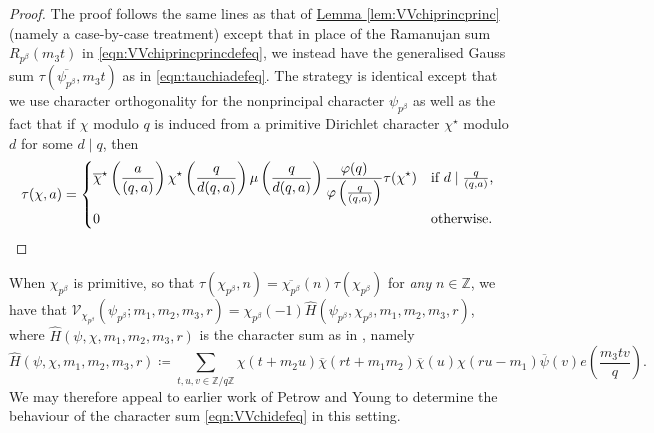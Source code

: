 \documentclass[11pt,a4paper]{amsart}
\newcommand{\VV}{\mathcal{V}}
\newcommand{\Z}{\mathbb{Z}}
\numberwithin{equation}{section}
\theoremstyle{remark}
\theoremstyle{definition}
\begin{document}
\begin{proof}
The proof follows the same lines as that of \hyperref[lem:VVchiprincprinc]{Lemma \ref*{lem:VVchiprincprinc}} (namely a case-by-case treatment) except that in place of the Ramanujan sum $R_{p^{\beta}}(m_3 t)$ in \eqref{eqn:VVchiprincprincdefeq}, we instead have the generalised Gauss sum $\tau(\overline{\psi_{p^{\beta}}},m_3 t)$ as in \eqref{eqn:tauchiadefeq}. The strategy is identical except that we use character orthogonality for the nonprincipal character $\psi_{p^{\beta}}$ as well as the fact that if $\chi$ modulo $q$ is induced from a primitive Dirichlet character $\chi^{\star}$ modulo $d$ for some $d \mid q$, then
\[\tau(\chi,a) = \begin{dcases*}
\overline{\chi}^{\star}\left(\frac{a}{(q,a)}\right) \chi^{\star}\left(\frac{q}{d(q,a)}\right) \mu\left(\frac{q}{d(q,a)}\right) \frac{\varphi(q)}{\varphi\left(\frac{q}{(q,a)}\right)} \tau(\chi^{\star}) & if $d \mid \frac{q}{(q,a)}$,	\\
0 & otherwise.
\end{dcases*}\]
\par\vspace{-1.33\baselineskip}\qedhere
\end{proof}

When $\chi_{p^{\beta}}$ is primitive, so that $\tau(\chi_{p^{\beta}},n) = \overline{\chi_{p^{\beta}}}(n) \tau(\chi_{p^{\beta}})$ for \emph{any} $n \in \Z$, we have that $\VV_{\chi_{p^{\beta}}}(\psi_{p^{\beta}};m_1,m_2,m_3,r) = \chi_{p^{\beta}}(-1) \widehat{H}(\psi_{p^{\beta}},\chi_{p^{\beta}},m_1,m_2,m_3,r)$, where $\widehat{H}(\psi,\chi,m_1,m_2,m_3,r)$ is the character sum as in \cite[(5.13)]{PY20}, namely
\[\widehat{H}(\psi,\chi,m_1,m_2,m_3,r) \coloneqq \sum_{t,u,v \in \Z/q\Z} \chi(t + m_2 u) \overline{\chi}(rt + m_1 m_2) \overline{\chi}(u) \chi(ru - m_1) \overline{\psi}(v) e\left(\frac{m_3 tv}{q}\right).\]
We may therefore appeal to earlier work of Petrow and Young to determine the behaviour of the character sum \eqref{eqn:VVchidefeq} in this setting.
\end{document}
